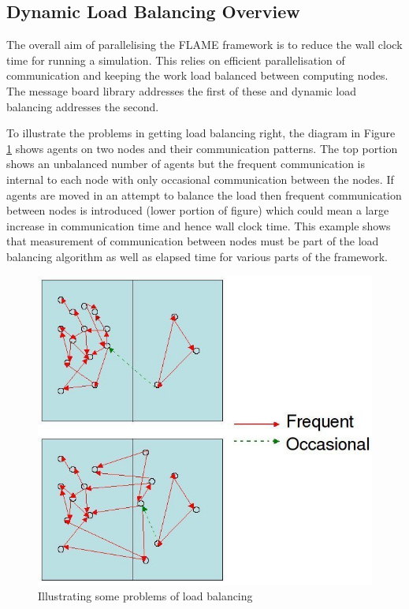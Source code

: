 \subsection{Dynamic Load Balancing Overview}

The overall aim of parallelising the FLAME framework is to reduce the wall clock time for running a simulation. This relies on efficient parallelisation of communication and keeping the work load balanced between computing nodes. The message board library addresses the first of these and dynamic load balancing addresses the second.

To illustrate the problems in getting load balancing right, the diagram in Figure \ref{fig:load_balance_problem} shows agents on two nodes and their communication patterns. The top portion shows an unbalanced number of agents but the frequent communication is internal to each node with only occasional communication between the nodes. If agents are moved in an attempt to balance the load then frequent communication between nodes is introduced (lower portion of figure) which could mean a large increase in communication time and hence wall clock time. This example shows that measurement of communication between nodes must be part of the load balancing algorithm as well as elapsed time for various parts of the framework.

\begin{figure}[h]
 \centering
  \includegraphics[scale=0.50]{load_balance.jpg}
 \caption{Illustrating some problems of load balancing}
 \label{fig:load_balance_problem}
\end{figure}

